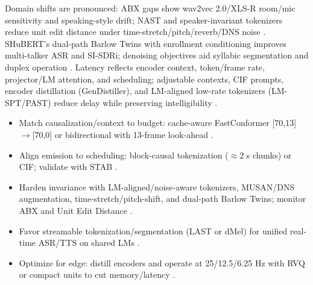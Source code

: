 \documentclass{article}
\begin{document}
Domain shifts are pronounced: ABX gaps show wav2vec 2.0/XLS-R room/mic sensitivity and speaking-style drift; NAST and speaker-invariant tokenizers reduce unit edit distance under time-stretch/pitch/reverb/DNS noise \cite{fily2024establishingdegreesclosenessbetweenaudio,messica2024nastnoiseawarespeechtokenizationlanguage,chang2024dcspinspeakerinvariantspeechtokenizerspo}. SHuBERT's dual-path Barlow Twins with enrollment conditioning improves multi-talker ASR and SI-SDRi; denoising objectives aid syllabic segmentation and duplex operation \cite{entry2025selectivehubertselfsupervisedpretraining,cho2025sylbersyllabicembeddingrepresentationspe,ma2024languagemodelcanlistenwhilespeaking}. Latency reflects encoder context, token/frame rate, projector/LM attention, and scheduling; adjustable contexts, CIF prompts, encoder distillation (GenDistiller), and LM-aligned low-rate tokenizers (LM-SPT/PAST) reduce delay while preserving intelligibility \cite{chen2024bestowefficientstreamablespeechlanguagem,deng2025simuls2sllmunlockingsimultaneousinferenc,gao2024gendistillerdistillingpretrainedlanguage,jo2025lmsptalignedsemanticdistillationspeechto,har-tuv2025pastphoneticacousticspeechtokenizer}.

\begin{itemize}
  \item Match causalization/context to budget: cache-aware FastConformer [70,13]$\rightarrow$[70,0] or bidirectional with 13-frame look-ahead \cite{chen2024bestowefficientstreamablespeechlanguagem}.
  \item Align emission to scheduling: block-causal tokenization ($\approx$2 s chunks) or CIF; validate with STAB \cite{vashishth2024stabspeechtokenizerassessmentbenchmark,deng2025simuls2sllmunlockingsimultaneousinferenc}.
  \item Harden invariance with LM-aligned/noise-aware tokenizers, MUSAN/DNS augmentation, time-stretch/pitch-shift, and dual-path Barlow Twins; monitor ABX and Unit Edit Distance \cite{turetzky2024lastlanguagemodelawarespeechtokenization,messica2024nastnoiseawarespeechtokenizationlanguage,poli2025fastabxlibraryefficientcomputationabxdis}.
  \item Favor streamable tokenization/segmentation (LAST or dMel) for unified real-time ASR/TTS on shared LMs \cite{turetzky2024lastlanguagemodelawarespeechtokenization,bai2025dmelspeechtokenizationmadesimple}.
  \item Optimize for edge: distill encoders and operate at 25/12.5/6.25 Hz with RVQ or compact units to cut memory/latency \cite{ahasan2025dmcodecdistillingmultimodalrepresentatio,jo2025lmsptalignedsemanticdistillationspeechto}.
\end{itemize}
\end{document}
